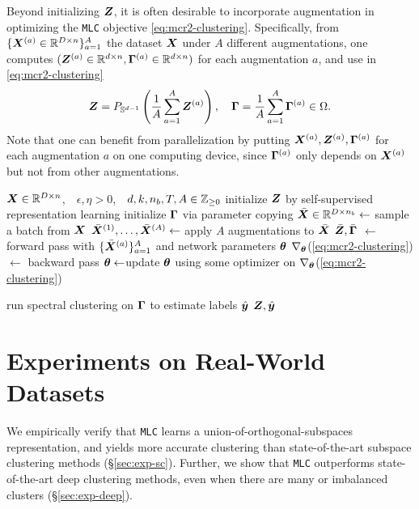 \documentclass[10pt,twocolumn,letterpaper]{article}
\newcommand{\ours}{MLC}
\newcommand{\mours}{\texttt{\ours}}
\begin{document}
    Beyond initializing ${\bm{Z}}$, it is often desirable to incorporate augmentation in optimizing the \mours{} objective \eqref{eq:mcr2-clustering}. Specifically, from $\{{\bm{X}}^{(a)}\in {\mathbb{R}}^{D\times n} \}_{a=1}^A$ the dataset ${\bm{X}}$ under $A$ different augmentations, one computes $({\bm{Z}}^{(a)}\in{\mathbb{R}}^{d\times n}, \boldsymbol{\Gamma}^{(a)}\in{\mathbb{R}}^{d\times n})$ for each augmentation $a$, and use in \eqref{eq:mcr2-clustering}
   {\small
   \begin{equation}
       {\bm{Z}}=P_{{\mathbb{S}}^{d-1}}\left(\frac{1}{A} \sum_{a=1}^A {\bm{Z}}^{(a)} \right), \quad \boldsymbol{\Gamma}=\frac{1}{A}\sum_{a=1}^A\boldsymbol{\Gamma}^{(a)}\in \Omega.\label{eq:aug}
   \end{equation}
   }
   Note that one can benefit from parallelization by putting ${\bm{X}}^{(a)},{\bm{Z}}^{(a)},\boldsymbol{\Gamma}^{(a)}$ for each augmentation $a$ on one computing device, since $\boldsymbol{\Gamma}^{(a)}$ only depends on ${\bm{X}}^{(a)}$ but not from other augmentations.
   \begin{algorithm}[t]
   \caption{\mours: Manifold Linearizing and Clustering}\label{alg:mcr2-clustering}
   \begin{algorithmic}[1]
   \Require ${\bm{X}}\in {\mathbb{R}}^{D\times n}$, \,\, $\epsilon,\eta > 0$, \,\, $d,k,n_b,T,A \in {\mathbb{Z}}_{\geq 0}$
   \State initialize ${\bm{Z}}$ by self-supervised representation learning \Comment{(\ref{eq:opt-tcr-sup})} \label{alg-line:self-sup-init}
   \State initialize $\boldsymbol{\Gamma}$ via parameter copying
        \label{alg-line:start-mlc}
           \State  $\bar{{\bm{X}}}\in{\mathbb{R}}^{D\times n_{b}} \gets$ sample a batch from ${\bm{X}}$
           \State $\bar{{\bm{X}}}^{(1)},\dots, \bar{{\bm{X}}}^{(A)}\gets$ apply $A$ augmentations to $\bar{{\bm{X}}}$
           \State $\bar{{\bm{Z}}},\bar{\boldsymbol{\Gamma}}$ $\gets$ forward pass with $\{\bar{{\bm{X}}}^{(a)}\}_{a=1}^A$ and network parameters $\boldsymbol{\theta}$ \Comment{(\ref{eq:aug})}
           \State $\nabla_{\boldsymbol{\theta}}$(\ref{eq:mcr2-clustering}) $\gets$ backward pass
           \State $\boldsymbol{\theta}\gets$update $\boldsymbol{\theta}$ using some optimizer on $\nabla_{\boldsymbol{\theta}}$(\ref{eq:mcr2-clustering})
       \EndFor \label{alg-line:end-mlc}
   
   \State run spectral clustering on $\boldsymbol{\Gamma}$ to estimate labels $\hat{{\bm{y}}}$ \label{alg-line: spectral-clustering}
   \Ensure ${\bm{Z}}, \hat{{\bm{y}}}$
   \end{algorithmic}
   \end{algorithm}
   
   
   
   
   \section{Experiments on Real-World Datasets} \label{sec:exp}
    We empirically verify that \mours{} learns a union-of-orthogonal-subspaces representation, and yields more accurate clustering than state-of-the-art subspace clustering methods (\S \ref{sec:exp-sc}). 
   Further, we show that \mours{} outperforms state-of-the-art deep clustering methods, even when there are many or imbalanced clusters (\S \ref{sec:exp-deep}).
   
\end{document}
